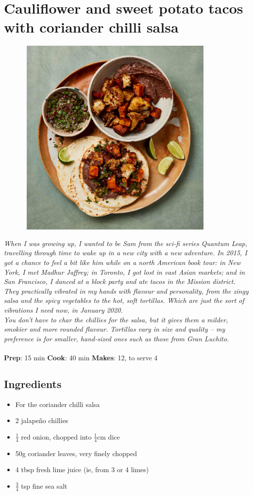 \documentclass{book}
\begin{document}
\section{Cauliflower and sweet potato tacos with coriander chilli salsa}
\begin{figure}
\centering\includegraphics[width=10cm,height=10cm,keepaspectratio]{Recipe_Pictures/Cauliflower_and_sweet_potato_tacos_with_coriander_chilli_salsa.png}
\end{figure}
\emph{When I was growing up, I wanted to be Sam from the sci-fi series Quantum Leap, travelling through time to wake up in a new city with a new adventure. In 2015, I got a chance to feel a bit like him while on a north American book tour: in New York, I met Madhur Jaffrey; in Toronto, I got lost in vast Asian markets; and in San Francisco, I danced at a block party and ate tacos in the Mission district. They practically vibrated in my hands with flavour and personality, from the zingy salsa and the spicy vegetables to the hot, soft tortillas. Which are just the sort of vibrations I need now, in January 2020.\\ 
You don’t have to char the chillies for the salsa, but it gives them a milder, smokier and more rounded flavour. Tortillas vary in size and quality – my preference is for smaller, hand-sized ones such as those from Gran Luchito.}\\\\ 
\textbf{Prep}: 15 min
\textbf{Cook}: 40 min
\textbf{Makes}: 12, to serve 4
\subsection*{Ingredients}
\begin{itemize}
\item For the coriander chilli salsa 
\item 2 jalapeño chillies 
\item $\frac{1}{4}$ red onion, chopped into $\frac{1}{4}$cm dice 
\item 50g coriander leaves, very finely chopped
\item 4 tbsp fresh lime juice (ie, from 3 or 4 limes)
\item $\frac{3}{4}$ tsp fine sea salt
\end{itemize}
\end{document}
